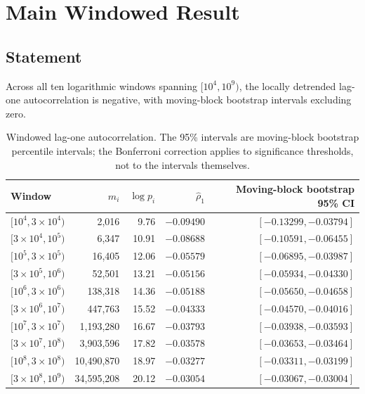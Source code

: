 \documentclass[11pt]{article}
\begin{document}
\section{Main Windowed Result}\label{sec:main}

\subsection{Statement}
Across all ten logarithmic windows spanning $[10^4, 10^9)$, the
locally detrended lag-one autocorrelation is negative, with
moving-block bootstrap intervals excluding zero.

\begin{table}[H]\centering
\caption{Windowed lag-one autocorrelation. The 95\% intervals are
moving-block bootstrap percentile intervals; the Bonferroni correction
applies to significance thresholds, not to the intervals themselves.}
\label{tab:rho1}
\begin{tabular}{lrrrr}
\toprule
Window & $m_i$ & $\log p_i$ & $\hat\rho_1$ & Moving-block bootstrap 95\% CI \\
\midrule
$[10^4, 3\times10^4)$  & 2,016     & 9.76  & $-0.09490$ & $[-0.13299, -0.03794]$ \\
$[3\times10^4, 10^5)$  & 6,347     & 10.91 & $-0.08688$ & $[-0.10591, -0.06455]$ \\
$[10^5, 3\times10^5)$  & 16,405    & 12.06 & $-0.05579$ & $[-0.06895, -0.03987]$ \\
$[3\times10^5, 10^6)$  & 52,501    & 13.21 & $-0.05156$ & $[-0.05934, -0.04330]$ \\
$[10^6, 3\times10^6)$  & 138,318   & 14.36 & $-0.05188$ & $[-0.05650, -0.04658]$ \\
$[3\times10^6, 10^7)$  & 447,763   & 15.52 & $-0.04333$ & $[-0.04570, -0.04016]$ \\
$[10^7, 3\times10^7)$  & 1,193,280 & 16.67 & $-0.03793$ & $[-0.03938, -0.03593]$ \\
$[3\times10^7, 10^8)$  & 3,903,596 & 17.82 & $-0.03578$ & $[-0.03653, -0.03464]$ \\
$[10^8, 3\times10^8)$  & 10,490,870 & 18.97 & $-0.03277$ & $[-0.03311, -0.03199]$ \\
$[3\times10^8, 10^9)$  & 34,595,208 & 20.12 & $-0.03054$ & $[-0.03067, -0.03004]$ \\
\bottomrule
\end{tabular}
\end{table}
\end{document}

